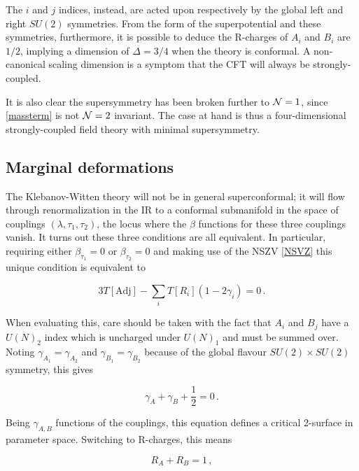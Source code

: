 The $i$ and $j$ indices, instead, are acted upon respectively by the global left and right $SU(2)$ symmetries. From the form of the superpotential and these symmetries, furthermore, it is possible to deduce the R-charges of $A_i$ and $B_i$ are $1/2$, implying a dimension of $\Delta = 3/4$ when the theory is conformal. A non-canonical scaling dimension is a symptom that the CFT will always be strongly-coupled.

It is also clear the supersymmetry has been broken further to $\mathcal{N} = 1$, since \eqref{massterm} is not $\mathcal{N} = 2$ invariant. The case at hand is thus a four-dimensional strongly-coupled field theory with minimal supersymmetry.

\subsection{Marginal deformations}\label{sec:KWmarginal}

The Klebanov-Witten theory will not be in general superconformal; it will flow through renormalization in the IR to a conformal submanifold in the space of couplings $(\lambda,\tau_1,\tau_2)$, the locus where the $\beta$ functions for these three couplings vanish. It turns out these three conditions are all equivalent. In particular, requiring either $\beta_{\tau_1} = 0$ or $\beta_{\tau_2} = 0$ and making use of the NSZV \eqref{NSVZ} this unique condition is equivalent to

\begin{equation}
	3 T[\mathrm{Adj}] - \sum_i T[R_i] ( 1- 2\gamma_i) = 0\,.
	\label{}
\end{equation}

When evaluating this, care should be taken with the fact that $A_i$ and $B_j$ have a $U(N)_2$ index which is uncharged under $U(N)_1$ and must be summed over. Noting $\gamma_{A_1} = \gamma_{A_2}$ and $\gamma_{B_1} = \gamma_{B_2}$ because of the global flavour $SU(2)\times SU(2)$ symmetry, this gives

\begin{equation}
	\gamma_A + \gamma_B + \frac{1}{2} = 0\,.
	\label{}
\end{equation}

Being $\gamma_{A,B}$ functions of the couplings, this equation defines a critical 2-surface in parameter space. Switching to R-charges, this means

\begin{equation}
	R_A + R_B = 1\,,
	\label{}
\end{equation}

